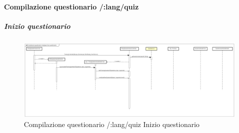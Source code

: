 \paragraph{Compilazione questionario /:lang/quiz}

\subparagraph{Inizio questionario}

\label{Compilazione questionario /:lang/quiz/:idQuiz Inizio questionario}

\begin{figure}[ht]
	\centering
	\includegraphics[scale=0.25,keepaspectratio]{UML/DiagrammiDiSequenza/Front-end/Quiz_start.png}
	\caption{Compilazione questionario /:lang/quiz Inizio questionario}
\end{figure} \FloatBarrier


